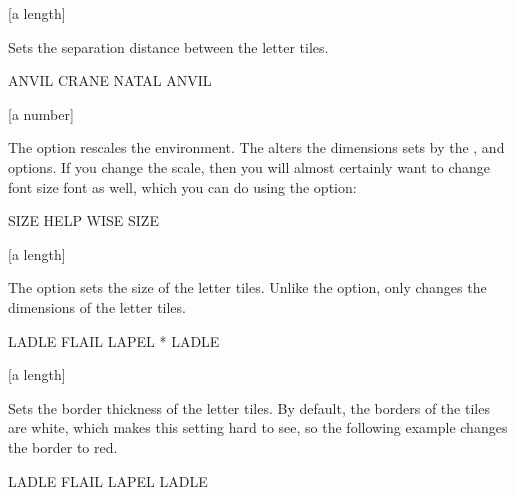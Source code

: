 \documentclass[svgnames]{report}
\begin{document}
  [a length]

  Sets the separation distance between the  letter
  tiles.

  \begin{example}
  \begin{wordle}[separation=2mm, borders=black]{ANVIL}
    CRANE
    NATAL
    ANVIL
  \end{wordle}
  \end{example}

  [a number]

  The  option rescales the  environment.
  The  alters the dimensions sets by the ,
    and   options.  If
  you change the scale, then you will almost certainly want
  to change font size font as well, which you can do using the
   option:

  \begin{example}
  \begin{wordle}[scale=1.5, font=\huge\bfseries]{SIZE}
     HELP
     WISE
     SIZE
  \end{wordle}
  \end{example}

  [a length]

  The  option sets the size of the  letter
  tiles. Unlike the  option,  only changes
  the dimensions of the letter tiles.

  \begin{example}
  \begin{wordle}[size=10mm, font=\huge\bfseries]{LADLE}
     FLAIL LAPEL * LADLE
  \end{wordle}
  \end{example}

  [a length]

  Sets the border thickness of the  letter tiles.  By
  default, the borders of the tiles are white, which makes this setting
  hard to see, so the following example changes the border to red.

  \begin{example}
  \begin{wordle}[thickness=1mm, borders=red]{LADLE}
     FLAIL
     LAPEL
     LADLE
  \end{wordle}
  \end{example}
\end{document}
